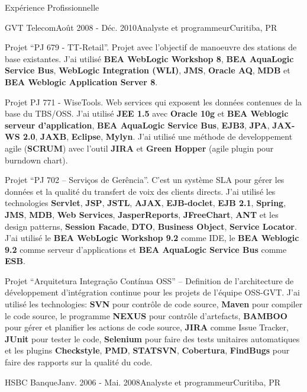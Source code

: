 \documentclass{resume}
\begin{document}
\begin{rSection}{Expérience Profissionnelle}
\begin{rSubsection}{GVT Telecom}{Août 2008 - Déc. 2010}{Analyste et programmeur}{Curitiba, PR}
    \item Projet “PJ 679 - TT-Retail”. Projet avec l’objectif de manoeuvre des stations de base existantes. J’ai utilisé \textbf{BEA WebLogic Workshop 8}, \textbf{BEA AquaLogic Service Bus}, \textbf{WebLogic Integration (WLI)}, \textbf{JMS}, \textbf{Oracle AQ}, \textbf{MDB} et \textbf{BEA Weblogic Application Server 8}.\\
    \item Projet PJ 771 - WiseTools. Web services qui exposent les données contenues de la base du TBS/OSS. J’ai utilisé \textbf{JEE 1.5} avec \textbf{Oracle 10g} et \textbf{BEA Weblogic serveur d'application}, \textbf{BEA AquaLogic Service Bus}, \textbf{EJB3}, \textbf{JPA}, \textbf{JAX-WS 2.0}, \textbf{JAXB}, \textbf{Eclipse}, \textbf{Mylyn}. J'ai utilisé une méthode de developpement agile (\textbf{SCRUM}) avec l'outil \textbf{JIRA} et \textbf{Green Hopper} (agile plugin pour burndown chart).\\
    \item Projet “PJ 702 – Serviços de Gerência”. C’est un système SLA pour gérer les données et la qualité du transfert de voix des clients directs. J’ai utilisé les technologies \textbf{Servlet}, \textbf{JSP}, \textbf{JSTL}, \textbf{AJAX}, \textbf{EJB-doclet}, \textbf{EJB 2.1}, \textbf{Spring}, \textbf{JMS}, \textbf{MDB}, \textbf{Web Services}, \textbf{JasperReports}, \textbf{JFreeChart}, \textbf{ANT} et les design patterns, \textbf{Session Facade}, \textbf{DTO}, \textbf{Business Object}, \textbf{Service Locator}. J'ai utilisé le \textbf{BEA WebLogic Workshop 9.2} comme IDE, le \textbf{BEA Weblogic 9.2} comme serveur d'applications et \textbf{BEA AquaLogic Service Bus} comme \textbf{ESB}.\\
    \item Projet “Arquitetura Integração Contínua OSS” – Definition de l’architecture de développement d’intégration continue pour les projets de l'équipe OSS-GVT. J'ai utilisé les technologies: \textbf{SVN} pour contrôle de code source, \textbf{Maven} pour compiler le code source, le programme \textbf{NEXUS} pour contrôle d'artefacts, \textbf{BAMBOO} pour gérer et planifier les actions de code source, \textbf{JIRA} comme Issue Tracker, \textbf{JUnit} pour tester le code, \textbf{Selenium} pour faire des tests unitaires automatiques et les plugins \textbf{Checkstyle}, \textbf{PMD}, \textbf{STATSVN}, \textbf{Cobertura}, \textbf{FindBugs} pour faire des rapports sur la qualité du code.
    \end{rSubsection}
    \begin{rSubsection}{HSBC Banque}{Janv. 2006 - Mai. 2008}{Analyste et programmeur}{Curitiba, PR}

\end{rSubsection}
\end{rSection}
\end{document}
